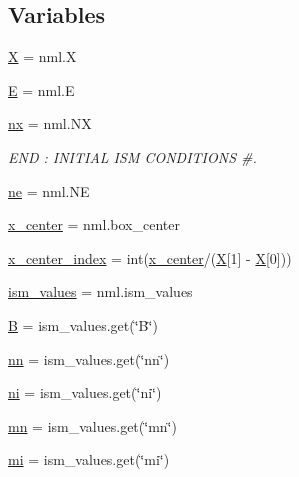 \subsection*{Variables}
\begin{DoxyCompactItemize}
\item 
\hyperlink{namespacesetup__vdiff_a2d0381db5d912bb072d7cfa7c997de97}{X} = nml.\+X
\item 
\hyperlink{namespacesetup__vdiff_a7780682c76ff3896106f4045b64e582a}{E} = nml.\+E
\item 
\hyperlink{namespacesetup__vdiff_a442f28b6703d49816e93a23f6486abda}{nx} = nml.\+NX
\begin{DoxyCompactList}\small\item\em E\+ND \+: I\+N\+I\+T\+I\+AL I\+SM C\+O\+N\+D\+I\+T\+I\+O\+NS \#. \end{DoxyCompactList}\item 
\hyperlink{namespacesetup__vdiff_a7181dfed2ce727915ce2f4c6f6536317}{ne} = nml.\+NE
\item 
\hyperlink{namespacesetup__vdiff_af577fed18e10308814044775943892ca}{x\+\_\+center} = nml.\+box\+\_\+center
\item 
\hyperlink{namespacesetup__vdiff_a76c3ba2eb6a6a9c7ed87d8a4de754771}{x\+\_\+center\+\_\+index} = int(\hyperlink{namespacesetup__vdiff_af577fed18e10308814044775943892ca}{x\+\_\+center}/(\hyperlink{namespacesetup__vdiff_a2d0381db5d912bb072d7cfa7c997de97}{X}\mbox{[}1\mbox{]} -\/ \hyperlink{namespacesetup__vdiff_a2d0381db5d912bb072d7cfa7c997de97}{X}\mbox{[}0\mbox{]}))
\item 
\hyperlink{namespacesetup__vdiff_aa35267b78597abc4269ab0277b941893}{ism\+\_\+values} = nml.\+ism\+\_\+values
\item 
\hyperlink{namespacesetup__vdiff_a4d3774a744ba299dec1abfdd1604dd6b}{B} = ism\+\_\+values.\+get(\char`\"{}B\char`\"{})
\item 
\hyperlink{namespacesetup__vdiff_a3dbcfca64340e0c182987f04004ea4c9}{nn} = ism\+\_\+values.\+get(\char`\"{}nn\char`\"{})
\item 
\hyperlink{namespacesetup__vdiff_a3f0542f44af015761eec1a4616abad85}{ni} = ism\+\_\+values.\+get(\char`\"{}ni\char`\"{})
\item 
\hyperlink{namespacesetup__vdiff_a48ea0c87c878f62d2acf1a491a32eb81}{mn} = ism\+\_\+values.\+get(\char`\"{}mn\char`\"{})
\item 
\hyperlink{namespacesetup__vdiff_a6df39d82007581d5bf7c12efe1a6ad30}{mi} = ism\+\_\+values.\+get(\char`\"{}mi\char`\"{})
\item 

\end{DoxyCompactItemize}
